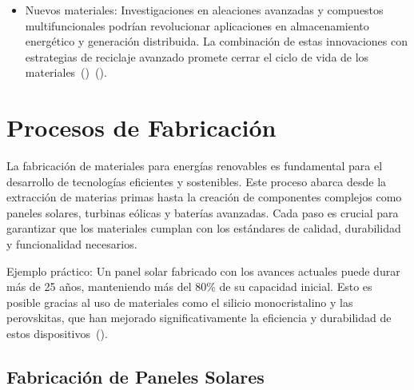 \documentclass[letterpaper, 12pt]{article}
\begin{document}
\begin{enumerate}
\begin{itemize}
                  \item Nuevos materiales: Investigaciones en aleaciones avanzadas y compuestos
                        multifuncionales podrían revolucionar aplicaciones en almacenamiento energético
                        y generación distribuida. La combinación de estas innovaciones con estrategias
                        de reciclaje avanzado promete cerrar el ciclo de vida de los
                        materiales~(\cite{Leader_Gaustad2019a})~(\cite{Kubik2020}).
            \end{itemize}
\end{enumerate}

\section{Procesos de Fabricación}

La fabricación de materiales para energías renovables es fundamental para el
desarrollo de tecnologías eficientes y sostenibles. Este proceso abarca desde
la extracción de materias primas hasta la creación de componentes complejos
como paneles solares, turbinas eólicas y baterías avanzadas. Cada paso es
crucial para garantizar que los materiales cumplan con los estándares de
calidad, durabilidad y funcionalidad necesarios.

Ejemplo práctico: Un panel solar fabricado con los avances actuales puede durar
más de 25 años, manteniendo más del 80\% de su capacidad inicial. Esto es
posible gracias al uso de materiales como el silicio monocristalino y las
perovskitas, que han mejorado significativamente la eficiencia y durabilidad de
estos dispositivos~(\cite{Henriksson2021}).

\subsection{Fabricación de Paneles Solares}
\end{document}

